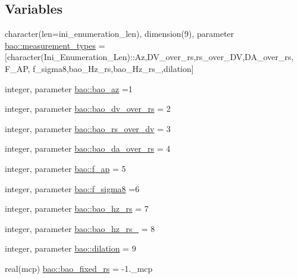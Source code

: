 \subsection*{Variables}
\begin{DoxyCompactItemize}
\item 
character(len=ini\+\_\+enumeration\+\_\+len), dimension(9), parameter \mbox{\hyperlink{namespacebao_a5a7cbf786aa65368c32203dfb9b72991}{bao\+::measurement\+\_\+types}} = \mbox{[}character(Ini\+\_\+\+Enumeration\+\_\+\+Len)\+::\textquotesingle{}Az\textquotesingle{},\textquotesingle{}D\+V\+\_\+over\+\_\+rs\textquotesingle{},\textquotesingle{}rs\+\_\+over\+\_\+\+DV\textquotesingle{},\textquotesingle{}D\+A\+\_\+over\+\_\+rs\textquotesingle{}, \textquotesingle{}F\+\_\+\+AP\textquotesingle{}, \textquotesingle{}f\+\_\+sigma8\textquotesingle{},\textquotesingle{}bao\+\_\+\+Hz\+\_\+rs\textquotesingle{},\textquotesingle{}bao\+\_\+\+Hz\+\_\+rs\+\_\textquotesingle{},\textquotesingle{}dilation\textquotesingle{}\mbox{]}
\item 
integer, parameter \mbox{\hyperlink{namespacebao_ab53a2d435899a21c918a07f7243d2a9f}{bao\+::bao\+\_\+az}} =1
\item 
integer, parameter \mbox{\hyperlink{namespacebao_a0524be8a1cd6362d8c5e0cc628384991}{bao\+::bao\+\_\+dv\+\_\+over\+\_\+rs}} = 2
\item 
integer, parameter \mbox{\hyperlink{namespacebao_aadd8d344c5506828f10eed295270faf7}{bao\+::bao\+\_\+rs\+\_\+over\+\_\+dv}} = 3
\item 
integer, parameter \mbox{\hyperlink{namespacebao_a5856a51527a41fd49a3222f83de0f1da}{bao\+::bao\+\_\+da\+\_\+over\+\_\+rs}} = 4
\item 
integer, parameter \mbox{\hyperlink{namespacebao_a90e9d6d857982260b5025f4778bf0a4d}{bao\+::f\+\_\+ap}} = 5
\item 
integer, parameter \mbox{\hyperlink{namespacebao_aaa65837538ed00f6c87276b81b451c45}{bao\+::f\+\_\+sigma8}} =6
\item 
integer, parameter \mbox{\hyperlink{namespacebao_a5d192049c79a222547036308959868c2}{bao\+::bao\+\_\+hz\+\_\+rs}} = 7
\item 
integer, parameter \mbox{\hyperlink{namespacebao_aad05aa1882f8f917547a2919bb25db43}{bao\+::bao\+\_\+hz\+\_\+rs\+\_}} = 8
\item 
integer, parameter \mbox{\hyperlink{namespacebao_a9bc55477c817a8204a8dd45a73ab6faa}{bao\+::dilation}} = 9
\item 
real(mcp) \mbox{\hyperlink{namespacebao_a4f0a92dc313e31a91e5edb5e2ef09fec}{bao\+::bao\+\_\+fixed\+\_\+rs}} = -\/1.\+\_\+mcp
\end{DoxyCompactItemize}
